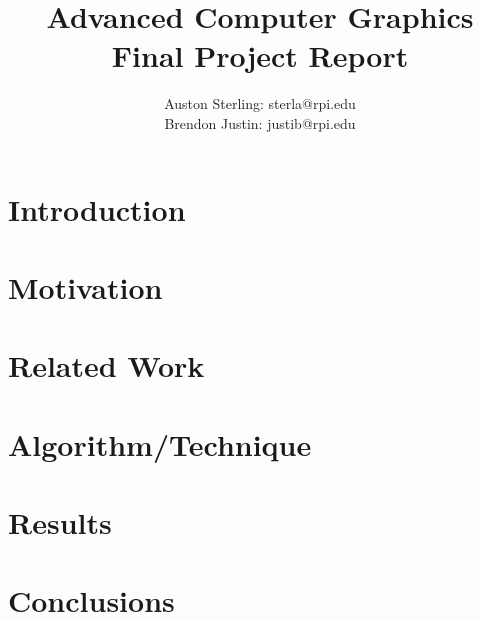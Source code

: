 \documentclass{article}
\begin{document}
\title{Advanced Computer Graphics Final Project Report}
\author{Auston Sterling: sterla@rpi.edu \\ Brendon Justin: justib@rpi.edu}
\date{}
\maketitle


\section{Introduction}

\section{Motivation}

\section{Related Work}

\section{Algorithm/Technique}

\section{Results}

\section{Conclusions}
\end{document}
